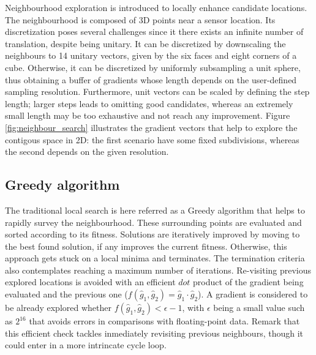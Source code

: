 Neighbourhood exploration is introduced to locally enhance candidate locations. The neighbourhood is composed of 3D points near a sensor location. Its discretization poses several challenges since it there exists an infinite number of translation, despite being unitary. It can be discretized by downscaling the neighbours to 14 unitary vectors, given by the six faces and eight corners of a cube. Otherwise, it can be discretized by uniformly subsampling a unit sphere, thus obtaining a buffer of gradients whose length depends on the user-defined sampling resolution. Furthermore, unit vectors can be scaled by defining the step length; larger steps leads to omitting good candidates, whereas an extremely small length may be too exhaustive and not reach any improvement. Figure \ref{fig:neighbour_search} illustrates the gradient vectors that help to explore the contigous space in 2D: the first scenario have some fixed subdivisions, whereas the second depends on the given resolution.


\subsection{Greedy algorithm}

The traditional local search is here referred as a Greedy algorithm that helps to rapidly survey the neighbourhood. These surrounding points are evaluated and sorted according to its fitness. Solutions are iteratively improved by moving to the best found solution, if any improves the current fitness. Otherwise, this approach gets stuck on a local minima and terminates. The termination criteria also contemplates reaching a maximum number of iterations. Re-visiting previous explored locations is avoided with an efficient $\textit{dot}$ product of the gradient being evaluated and the previous one ($f(\hat{g}_1, \hat{g}_2) = \hat{g}_1 \cdot \hat{g}_2$). A gradient is considered to be already explored whether $f(\hat{g}_1, \hat{g}_2) < \epsilon - 1$, with $\epsilon$ being a small value such as $2^{16}$ that avoids errors in comparisons with floating-point data. Remark that this efficient check tackles inmediately revisiting previous neighbours, though it could enter in a more intrincate cycle loop.

